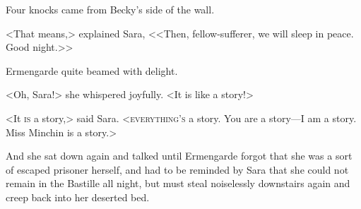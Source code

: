 Four knocks came from Becky's side of the wall.

<That means,> explained Sara, <<Then, fellow-sufferer, we will sleep in peace. Good night.>>

Ermengarde quite beamed with delight.

<Oh, Sara!> she whispered joyfully. <It is like a story!>

<It \textsc{is} a story,> said Sara. <\textsc{everything's} a story. You are a story—I am a story. Miss Minchin is a story.>

And she sat down again and talked until Ermengarde forgot that she was a sort of escaped prisoner herself, and had to be reminded by Sara that she could not remain in the Bastille all night, but must steal noiselessly downstairs again and creep back into her deserted bed.